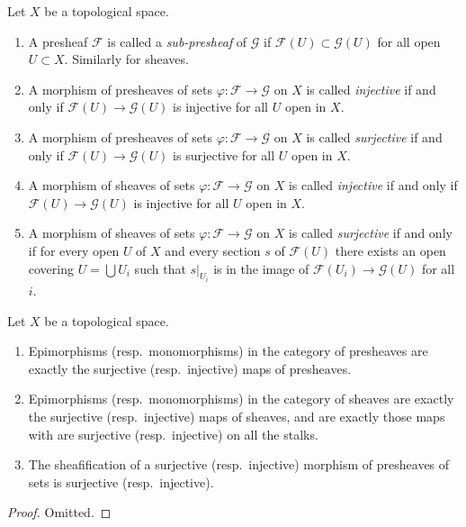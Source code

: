 \begin{definition}
\label{definition-injective-surjective}
Let $X$ be a topological space.
\begin{enumerate}
\item A presheaf $\mathcal{F}$ is called a {\it sub-presheaf} of
$\mathcal{G}$ if $\mathcal{F}(U) \subset \mathcal{G}(U)$ for all
open $U \subset X$. Similarly for sheaves.
\item A morphism of presheaves of sets $\varphi : \mathcal{F} \to \mathcal{G}$
on $X$ is called {\it injective} if and only if
$\mathcal{F}(U) \to \mathcal{G}(U)$ is injective for all $U$ open in $X$.
\item A morphism of presheaves of sets $\varphi : \mathcal{F} \to \mathcal{G}$
on $X$ is called {\it surjective} if and only if
$\mathcal{F}(U) \to \mathcal{G}(U)$ is surjective for all $U$ open in $X$.
\item A morphism of sheaves of sets $\varphi : \mathcal{F} \to \mathcal{G}$
on $X$ is called {\it injective} if and only if
$\mathcal{F}(U) \to \mathcal{G}(U)$ is injective for all $U$ open in $X$.
\item A morphism of sheaves of sets $\varphi : \mathcal{F} \to \mathcal{G}$
on $X$ is called {\it surjective} if and only if for every open
$U$ of $X$ and every section $s$ of $\mathcal{F}(U)$ there exists an
open covering $U = \bigcup U_i$ such that $s|_{U_i}$ is in
the image of $\mathcal{F}(U_i) \to \mathcal{G}(U)$ for all $i$.
\end{enumerate}
\end{definition}


\begin{lemma}
\label{lemma-characterize-epi-mono}
Let $X$ be a topological space.
\begin{enumerate}
\item Epimorphisms (resp.\ monomorphisms) in the category of
presheaves are exactly the surjective (resp.\ injective) maps
of presheaves.
\item Epimorphisms (resp.\ monomorphisms) in the category of
sheaves are exactly the surjective (resp.\ injective) maps
of sheaves, and are exactly those maps with are surjective
(resp.\ injective) on all the stalks.
\item The sheafification of a surjective (resp.\ injective)
morphism of presheaves of sets is surjective (resp.\ injective).
\end{enumerate}
\end{lemma}

\begin{proof}
Omitted.
\end{proof}


